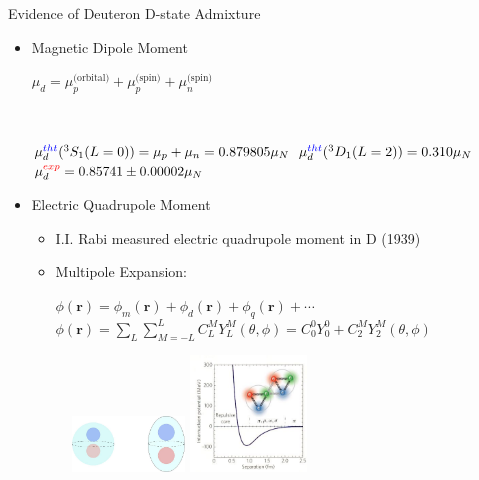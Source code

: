\documentclass{beamer}
\begin{document}
\begin{frame}{Evidence of Deuteron D-state Admixture}
\begin{itemize}
\item Magnetic Dipole Moment \begin{small}$\mu_{d}=\mu^{\text{(orbital)}}_{p}+\mu^{\text{(spin)}}_{p}+\mu^{\text{(spin)}}_{n}$ \end{small} \\ 
\vspace{1mm}
\begin{footnotesize}$\mu^{\textcolor{blue}{tht}}_{d}(^{3}S_{1}(L=0))=\mu_{p}+\mu_{n}=0.879805\mu_{N}$ \hspace{ 1mm } $\mu^{\textcolor{blue}{tht}}_{d}(^{3}D_{1}(L=2))=0.310\mu_{N}$  \\
\vspace{1mm} 
$\mu^{\textcolor{red}{exp}}_{d}=0.85741 \pm 0.00002\mu_{N}$ \end{footnotesize}  
\vspace{3mm}
\item Electric Quadrupole Moment
\begin{itemize}
\item I.I. Rabi measured electric quadrupole moment in D (1939) \\
\item Multipole Expansion: \begin{footnotesize} $\phi(\mathbf{r}) = \phi_{m}(\mathbf{r}) + \phi_{d}(\mathbf{r}) + \phi_{q}(\mathbf{r}) + \cdots$ \\
$\phi(\mathbf{r}) = \sum\limits_{L}\sum\limits_{M=-L}^{L}C_{L}^{M}Y_{L}^{M}(\theta,\phi) = C_{0}^{0}Y_{0}^{0} + C_{2}^{M}Y_{2}^{M}(\theta,\phi)$ \end{footnotesize}  
\end{itemize}
\begin{footnotesize}
\begin{figure}[h!]
\vspace{-0.3cm}\hspace{0.0cm}\includegraphics[width=3.0cm]{multipole.jpg} \hspace{2.4cm} \includegraphics[width=3.1cm]{NN_potential.jpg}

\end{figure}
\end{footnotesize}
\end{itemize}
\end{frame}
\end{document}
